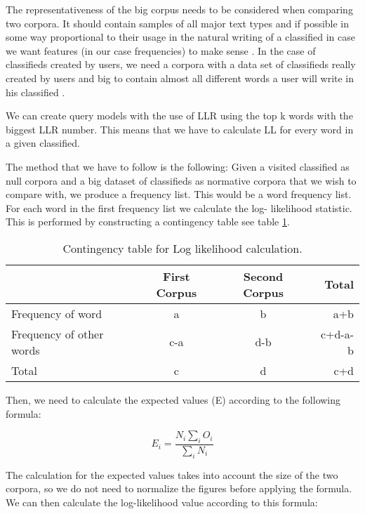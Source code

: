 The representativeness of the big corpus needs to be considered when comparing two corpora. It should contain samples of all major text types and if possible in some way proportional to their usage in the natural writing of a classified in case we want features (in our case frequencies) to make sense . In the case of classifieds created by users, we need a corpora with a data set of classifieds really created by users and big to contain almost all different words a user will write in his classified \cite{RaysonGarside}.

We can create query models with the use of LLR using the top k words with the biggest LLR number. This means that we have to calculate LL for every word in a given classified.

The method that we have to follow is the following:
Given a visited classified as null corpora and a big dataset of classifieds as normative corpora that we wish to compare with, we produce a frequency list. This would be a word frequency list. For each word in the first frequency list we calculate the log- likelihood statistic. This is performed by constructing a contingency table see table \ref{table:contigency}.


\begin{table}[H]
\begin{center}
\footnotesize
\caption{Contingency table for Log likelihood calculation.}
\label{table:contigency}
\begin{tabular}{lccr}
\toprule
&  First Corpus & Second Corpus & Total \\
\midrule
Frequency of word & a &	b & a+b \\
Frequency of other words & c-a & d-b & c+d-a-b \\
Total & c & d & c+d \\
\bottomrule
\end{tabular}
\end{center}
\end{table}

Then, we need to calculate the expected values (E) according to the following formula:

\begin{equation}
E_i= \frac{N_{i}\sum_{i}{O_{i}}}{\sum_{i}{N_{i}}}
\end{equation}

The calculation for the expected values takes into account the size of the two corpora, so we do not need to normalize the figures before applying the formula. We can then calculate the log-likelihood value according to this formula:


